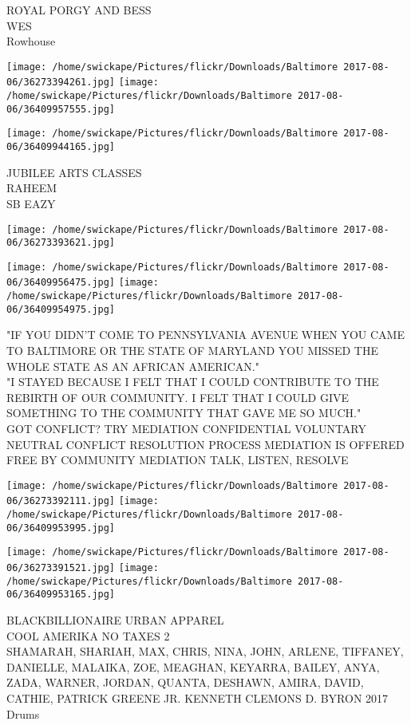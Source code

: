 \documentclass[10pt,letterpaper]{article}
\begin{document}
ROYAL PORGY AND BESS\\
WES\\
Rowhouse
\pagebreak

\texttt{[image: /home/swickape/Pictures/flickr/Downloads/Baltimore 2017-08-06/36273394261.jpg]}
\texttt{[image: /home/swickape/Pictures/flickr/Downloads/Baltimore 2017-08-06/36409957555.jpg]}

\vspace{0.25in}
\texttt{[image: /home/swickape/Pictures/flickr/Downloads/Baltimore 2017-08-06/36409944165.jpg]}

JUBILEE ARTS CLASSES\\
RAHEEM\\
SB EAZY
\pagebreak

\texttt{[image: /home/swickape/Pictures/flickr/Downloads/Baltimore 2017-08-06/36273393621.jpg]}

\vspace{0.25in}
\texttt{[image: /home/swickape/Pictures/flickr/Downloads/Baltimore 2017-08-06/36409956475.jpg]}
\texttt{[image: /home/swickape/Pictures/flickr/Downloads/Baltimore 2017-08-06/36409954975.jpg]}

"IF YOU DIDN'T COME TO PENNSYLVANIA AVENUE WHEN YOU CAME TO BALTIMORE OR THE STATE OF MARYLAND YOU MISSED THE WHOLE STATE AS AN AFRICAN AMERICAN."\\
"I STAYED BECAUSE I FELT THAT I COULD CONTRIBUTE TO THE REBIRTH OF OUR COMMUNITY.  I FELT THAT I COULD GIVE SOMETHING TO THE COMMUNITY THAT GAVE ME SO MUCH."\\
GOT CONFLICT?  TRY MEDIATION CONFIDENTIAL VOLUNTARY NEUTRAL CONFLICT RESOLUTION PROCESS MEDIATION IS OFFERED FREE BY COMMUNITY MEDIATION TALK, LISTEN, RESOLVE
\pagebreak

\texttt{[image: /home/swickape/Pictures/flickr/Downloads/Baltimore 2017-08-06/36273392111.jpg]}
\texttt{[image: /home/swickape/Pictures/flickr/Downloads/Baltimore 2017-08-06/36409953995.jpg]}

\texttt{[image: /home/swickape/Pictures/flickr/Downloads/Baltimore 2017-08-06/36273391521.jpg]}
\texttt{[image: /home/swickape/Pictures/flickr/Downloads/Baltimore 2017-08-06/36409953165.jpg]}

BLACKBILLIONAIRE URBAN APPAREL\\
COOL AMERIKA NO TAXES 2\\
SHAMARAH, SHARIAH, MAX, CHRIS, NINA, JOHN, ARLENE, TIFFANEY, DANIELLE, MALAIKA, ZOE, MEAGHAN, KEYARRA, BAILEY, ANYA, ZADA, WARNER, JORDAN, QUANTA, DESHAWN, AMIRA, DAVID, CATHIE, PATRICK GREENE JR. KENNETH CLEMONS D. BYRON 2017\\
Drums
\pagebreak
\end{document}
